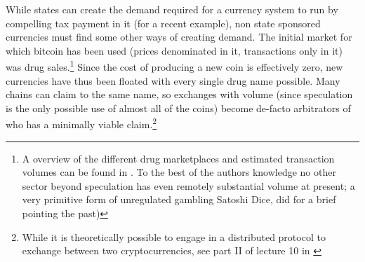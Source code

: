 While states can create the demand required for a currency system to run by compelling tax payment in it (for a recent example), non state sponsored currencies must find some other ways of creating demand.
The initial market for which bitcoin has been used (prices denominated in it, transactions only in it) was drug sales.\footnote{A overview of the different drug marketplaces and estimated transaction volumes can be found in \cite{soska2015measuring}. To the best of the authors knowledge no other sector beyond speculation has even remotely substantial volume at present; a very primitive form of unregulated gambling Satoshi Dice, did for a brief pointing the past)   }
Since the cost of producing a new coin is effectively zero, new currencies have thus been floated with every single drug name possible. Many chains can claim to the same name, so exchanges with volume (since speculation is the only possible use of almost all of the coins) become de-facto arbitrators of who has a minimally viable claim.\footnote{While it is theoretically possible to engage in a distributed protocol to exchange between two cryptocurrencies, see part II of lecture 10 in \cite{princeton10}}






